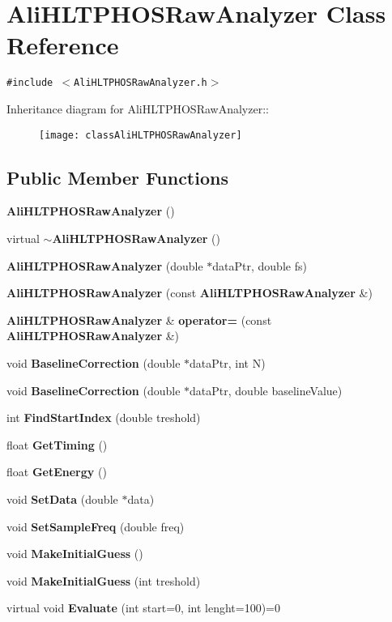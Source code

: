 \section{Ali\-HLTPHOSRaw\-Analyzer Class Reference}
\label{classAliHLTPHOSRawAnalyzer}
{\tt \#include $<$Ali\-HLTPHOSRaw\-Analyzer.h$>$}

Inheritance diagram for Ali\-HLTPHOSRaw\-Analyzer::\begin{figure}[H]
\begin{center}
\leavevmode
\texttt{[image: classAliHLTPHOSRawAnalyzer]}
\end{center}
\end{figure}
\subsection*{Public Member Functions}
\begin{CompactItemize}
\item 
{\bf Ali\-HLTPHOSRaw\-Analyzer} ()
\item 
virtual {\bf $\sim$Ali\-HLTPHOSRaw\-Analyzer} ()
\item 
{\bf Ali\-HLTPHOSRaw\-Analyzer} (double $\ast$data\-Ptr, double fs)
\item 
{\bf Ali\-HLTPHOSRaw\-Analyzer} (const {\bf Ali\-HLTPHOSRaw\-Analyzer} \&)
\item 
{\bf Ali\-HLTPHOSRaw\-Analyzer} \& {\bf operator=} (const {\bf Ali\-HLTPHOSRaw\-Analyzer} \&)
\item 
void {\bf Baseline\-Correction} (double $\ast$data\-Ptr, int N)
\item 
void {\bf Baseline\-Correction} (double $\ast$data\-Ptr, double baseline\-Value)
\item 
int {\bf Find\-Start\-Index} (double treshold)
\item 
float {\bf Get\-Timing} ()
\item 
float {\bf Get\-Energy} ()
\item 
void {\bf Set\-Data} (double $\ast$data)
\item 
void {\bf Set\-Sample\-Freq} (double freq)
\item 
void {\bf Make\-Initial\-Guess} ()
\item 
void {\bf Make\-Initial\-Guess} (int treshold)
\item 
virtual void {\bf Evaluate} (int start=0, int lenght=100)=0
\end{CompactItemize}

